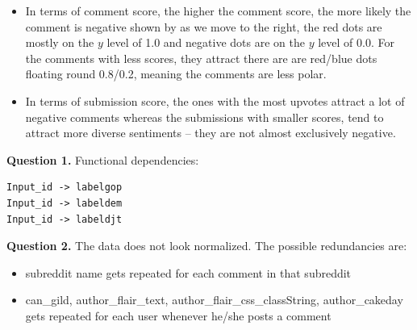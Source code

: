 \documentclass{article}
\begin{document}
\begin{enumerate}
\begin{itemize}
	\item In terms of comment score, the higher the comment score, the more likely the comment is negative shown by as we move to the right, the red dots are mostly on the  $y$ level of 1.0 and negative dots are on the $y$ level of 0.0. For the comments with less scores, they attract there are are red/blue dots floating round 0.8/0.2, meaning the comments are less polar.
	\item In terms of submission score, the ones with the most upvotes attract a lot of negative comments whereas the submissions with smaller scores, tend to attract more diverse sentiments -- they are not almost exclusively negative.
\end{itemize}
\end{enumerate}
\noindent \textbf{Question 1.} Functional dependencies:\\
\begin{verbatim}
Input_id -> labelgop
Input_id -> labeldem
Input_id -> labeldjt	
\end{verbatim}
\noindent \textbf{Question 2.} The data does not look normalized. The possible redundancies are: 
\begin{itemize}
	\item subreddit name gets repeated for each comment in that subreddit
	\item can\_gild, author\_flair\_text, author\_flair\_css\_classString, author\_cakeday gets repeated for each user whenever he/she posts a comment
\end{itemize}
\end{document}
